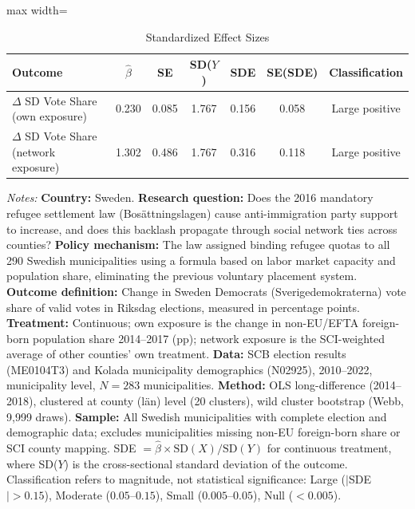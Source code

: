 \begin{table}[htbp]
\centering
\caption{Standardized Effect Sizes}
\label{tab:sde}
\begin{adjustbox}{max width=\textwidth}
\begin{tabular}{lcccccc}
\hline\hline
Outcome & $\hat{\beta}$ & SE & SD($Y$) & SDE & SE(SDE) & Classification \\
\hline
$\Delta$ SD Vote Share (own exposure) & 0.230 & 0.085 & 1.767 & 0.156 & 0.058 & Large positive \\
$\Delta$ SD Vote Share (network exposure) & 1.302 & 0.486 & 1.767 & 0.316 & 0.118 & Large positive \\
\hline\hline
\end{tabular}
\end{adjustbox}
\begin{tablenotes}[flushleft]
\small
\item \textit{Notes:} \textbf{Country:} Sweden. \textbf{Research question:} Does the 2016 mandatory refugee settlement law (Bos\"attningslagen) cause anti-immigration party support to increase, and does this backlash propagate through social network ties across counties? \textbf{Policy mechanism:} The law assigned binding refugee quotas to all 290 Swedish municipalities using a formula based on labor market capacity and population share, eliminating the previous voluntary placement system. \textbf{Outcome definition:} Change in Sweden Democrats (Sverigedemokraterna) vote share of valid votes in Riksdag elections, measured in percentage points. \textbf{Treatment:} Continuous; own exposure is the change in non-EU/EFTA foreign-born population share 2014--2017 (pp); network exposure is the SCI-weighted average of other counties' own treatment. \textbf{Data:} SCB election results (ME0104T3) and Kolada municipality demographics (N02925), 2010--2022, municipality level, $N = 283$ municipalities. \textbf{Method:} OLS long-difference (2014--2018), clustered at county (l\"an) level (20 clusters), wild cluster bootstrap (Webb, 9{,}999 draws). \textbf{Sample:} All Swedish municipalities with complete election and demographic data; excludes municipalities missing non-EU foreign-born share or SCI county mapping. SDE $= \hat{\beta} \times \text{SD}(X) / \text{SD}(Y)$ for continuous treatment, where SD($Y$) is the cross-sectional standard deviation of the outcome. Classification refers to magnitude, not statistical significance: Large ($|$SDE$| > 0.15$), Moderate ($0.05$--$0.15$), Small ($0.005$--$0.05$), Null ($< 0.005$).
\end{tablenotes}
\end{table}

